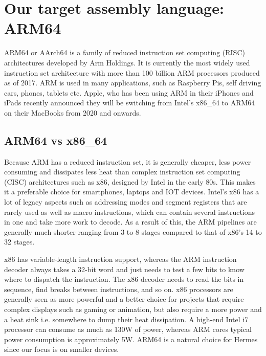 \section{Our target assembly language: ARM64}
ARM64 or AArch64 is a family of reduced instruction set computing (RISC) architectures developed by Arm Holdings.
It is currently the most widely used instruction set architecture with more than 100 billion ARM processors produced as of 2017\cite{ARM_sales}. 
ARM is used in many applications, such as Raspberry Pis, self driving cars, phones, tablets etc. Apple, who has been using ARM in their iPhones and iPads recently announced they will be switching from Intel's x86\_64 to ARM64 on their MacBooks from 2020 and onwards\cite{ARM_cpus_2020}.

\subsection{ARM64 vs x86\_64}
Because ARM has a reduced instruction set, it is generally cheaper, less power consuming and dissipates less heat than complex instruction set computing (CISC) architectures such as x86, designed by Intel in the early 80s. This makes it a preferable choice for smartphones, laptops and IOT devices.
Intel's x86 has a lot of legacy aspects such as addressing modes and segment registers that are rarely used as well as macro instructions, which can contain several instructions in one and take more work to decode. As a result of this, the ARM pipelines are generally much shorter ranging from 3 to 8 stages compared to that of x86's 14 to 32 stages\cite{pipeline_stages_wiki}. 

x86 has variable-length instruction support, whereas the ARM instruction decoder always takes a 32-bit word and just needs to test a few bits to know where to dispatch the instruction. The x86 decoder needs to read the bits in sequence, find breaks between instructions, and so on\cite{Chisnall2010}.
x86 processors are generally seen as more powerful and a better choice for projects that require complex displays such as gaming or animation, but also require a more power and a heat sink i.e. somewhere to dump their heat dissipation. A high-end Intel i7 processor can consume as much as 130W of power, whereas ARM cores typical power consumption is approximately 5W.
ARM64 is a natural choice for Hermes since our focus is on smaller devices.
